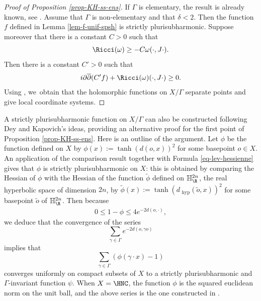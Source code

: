 \begin{proof}[Proof of Proposition \ref{prop-KH-ss-ens}]
If $\Gamma$ is elementary, the result is already known, see \cite[Th.\,1.1 and Proposition 1.3]{chenDiscreteGroupsHolomorphic2013}. Assume that $\Gamma$ is non-elementary and that $\delta<2$. Then the function $f$ defined in Lemma \ref{lem-f-unif-spsh} is strictly plurisubharmonic. Suppose moreover that there is a constant $C>0$ such that
\begin{equation*}
\Ricci(\omega)\ge -C\omega(\cdot,J\cdot).
\end{equation*}
Then there is a constant $C'>0$ such that
\begin{equation*}
i\partial\overline{\partial}(C'f) + \Ricci(\omega)(\cdot,J\cdot) \ge 0.
\end{equation*}
Using \cite[Prop.\,4.1]{chenDiscreteGroupsHolomorphic2013}, we~obtain that the holomorphic functions on $X/\Gamma$ separate points and give local coordinate systems.
\end{proof}

\begin{remark}A strictly plurisubharmonic function on $X/\Gamma$ can also be constructed following Dey and Kapovich's ideas, providing an alternative proof for the first point of Proposition \ref{prop-KH-ss-ens}. Here is an outline of the argument. Let $\phi$ be the function defined on $X$ by $\phi(x):=\tanh(d(o,x))^{2}$ for some basepoint $o\in X$. An application of the comparison result \cite[Th.\,A]{greeneFunctionTheoryManifolds1979} together with Formula \eqref{eq-lev-hessienne} gives that $\phi$ is strictly plurisubharmonic on $X$: this is obtained by comparing the Hessian of $\phi$ with the Hessian of the function $\widetilde{\phi}$ defined on $\mathbb{H}^{2n}_{\R}$, the real hyperbolic space of dimension $2n$, by $\widetilde{\phi}(x):= \tanh(d_{\text{ hyp}}(\widetilde{o},x))^{2}$ for some basepoint $\widetilde{o}$ of $\mathbb{H}^{2n}_{\R}$. Then because
\begin{align*}
0\leq 1-\phi \leq 4e^{-2d(o,\cdot)},
\end{align*}
we deduce that the convergence of the series
\begin{equation*}
\sum_{\gamma \in \Gamma}e^{-2d(o,\gamma o)}
\end{equation*} implies that
\begin{equation*}
\sum_{\gamma \in \Gamma}(\phi(\gamma\cdot x)-1)
\end{equation*} converges uniformly on compact subsets of $X$ to a strictly plurisubharmonic and $\Gamma$\nobreakdash-invariant function $\psi$. When $X=\HNC$, the function $\phi$ is the squared euclidean norm on the unit ball, and the above series is the one constructed in \cite{deyNoteComplexhyperbolicKleinian2020}.
\end{remark}


